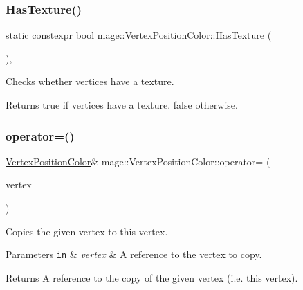 \subsubsection{\texorpdfstring{Has\+Texture()}{HasTexture()}}
{\footnotesize\ttfamily static constexpr bool mage\+::\+Vertex\+Position\+Color\+::\+Has\+Texture (\begin{DoxyParamCaption}{ }\end{DoxyParamCaption})\hspace{0.3cm}{\ttfamily [static]}, {\ttfamily [noexcept]}}

Checks whether vertices have a texture.

\begin{DoxyReturn}{Returns}
{\ttfamily true} if vertices have a texture. {\ttfamily false} otherwise. 
\end{DoxyReturn}
\hypertarget{structmage_1_1_vertex_position_color_aa621ed54ab2eee82d636a5805db5d28b}{}\label{structmage_1_1_vertex_position_color_aa621ed54ab2eee82d636a5805db5d28b} 
\subsubsection{\texorpdfstring{operator=()}{operator=()}\hspace{0.1cm}{\footnotesize\ttfamily [1/2]}}
{\footnotesize\ttfamily \hyperlink{structmage_1_1_vertex_position_color}{Vertex\+Position\+Color}\& mage\+::\+Vertex\+Position\+Color\+::operator= (\begin{DoxyParamCaption}\item[{const \hyperlink{structmage_1_1_vertex_position_color}{Vertex\+Position\+Color} \&}]{vertex }\end{DoxyParamCaption})\hspace{0.3cm}{\ttfamily [default]}}

Copies the given vertex to this vertex.


\begin{DoxyParams}[1]{Parameters}
\mbox{\tt in}  & {\em vertex} & A reference to the vertex to copy. \\
\hline
\end{DoxyParams}
\begin{DoxyReturn}{Returns}
A reference to the copy of the given vertex (i.\+e. this vertex). 
\end{DoxyReturn}
\hypertarget{structmage_1_1_vertex_position_color_a2c78f670a027a3891266dba88bfe9e87}{}\label{structmage_1_1_vertex_position_color_a2c78f670a027a3891266dba88bfe9e87} 

